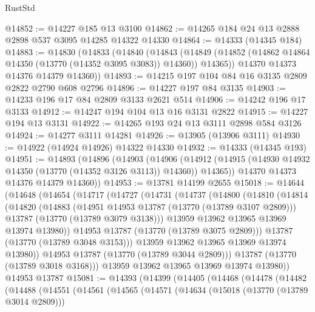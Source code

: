 \begin{lexlean}{RustStd}
\begin{coremodule}
@14852 := @14227 @185 @13 @3100
@14862 := @14265 @184 @24 @13 @2888 @2898 @537 @3095 @14285 @14322 @14330
@14864 := @14333 (@14345 @184)
@14883 := @14830
    (@14833
      (@14840
        (@14843
          (@14849 (@14852 (@14862 @14864 @14350 (@13770 (@14352 @3095 @3083)) @14360)) @14365))
        @14370
        @14373
        @14376
        @14379
        @14360))
@14893 := @14215 @197 @104 @84 @16 @3135 @2809 @2822 @2790 @608 @2796
@14896 := @14227 @197 @84 @3135
@14903 := @14233 @196 @17 @84 @2809 @3133 @2621 @514
@14906 := @14242 @196 @17 @3133
@14912 := @14247 @194 @104 @13 @16 @3131 @2822
@14915 := @14227 @194 @13 @3131
@14922 := @14265 @193 @24 @13 @3111 @2898 @584 @3126
@14924 := @14277 @3111 @14281
@14926 := @13905 (@13906 @3111)
@14930 := @14922 (@14924 @14926) @14322 @14330
@14932 := @14333 (@14345 @193)
@14951 := @14893
    (@14896
      (@14903
        (@14906
          (@14912 (@14915 (@14930 @14932 @14350 (@13770 (@14352 @3126 @3113)) @14360)) @14365))
        @14370
        @14373
        @14376
        @14379
        @14360))
@14953 := @13781 @14199 @2655
@15018 := @14644
    (@14648
      (@14654
        (@14717
          (@14727
            (@14731
              (@14737
                (@14800
                  (@14810
                    (@14814
                      (@14820
                        (@14883
                          (@14951 @14953 @13787 (@13770 (@13789 @3107 @2809)))
                          @13787
                          (@13770 (@13789 @3079 @3138)))
                        @13959
                        @13962
                        @13965
                        @13969
                        @13974
                        @13980))
                    @14953
                    @13787
                    (@13770 (@13789 @3075 @2809)))
                  @13787
                  (@13770 (@13789 @3048 @3153)))
                @13959
                @13962
                @13965
                @13969
                @13974
                @13980))
            @14953
            @13787
            (@13770 (@13789 @3044 @2809)))
          @13787
          (@13770 (@13789 @3018 @3168)))
        @13959
        @13962
        @13965
        @13969
        @13974
        @13980))
    @14953
    @13787
@15081 := @14393
    (@14399
      (@14405
        (@14468
          (@14478
            (@14482
              (@14488
                (@14551
                  (@14561
                    (@14565
                      (@14571
                        (@14634
                          (@15018 (@13770 (@13789 @3014 @2809)))

\end{coremodule}
\end{lexlean}
